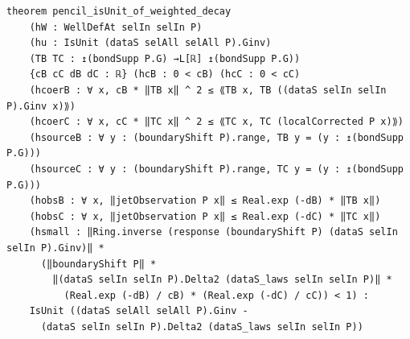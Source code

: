 \begin{theorem}[bp-248]
\begin{verbatim}
theorem pencil_isUnit_of_weighted_decay
    (hW : WellDefAt selIn selIn P)
    (hu : IsUnit (dataS selAll selAll P).Ginv)
    (TB TC : ↥(bondSupp P.G) →L[ℝ] ↥(bondSupp P.G))
    {cB cC dB dC : ℝ} (hcB : 0 < cB) (hcC : 0 < cC)
    (hcoerB : ∀ x, cB * ‖TB x‖ ^ 2 ≤ ⟪TB x, TB ((dataS selIn selIn P).Ginv x)⟫)
    (hcoerC : ∀ x, cC * ‖TC x‖ ^ 2 ≤ ⟪TC x, TC (localCorrected P x)⟫)
    (hsourceB : ∀ y : (boundaryShift P).range, TB y = (y : ↥(bondSupp P.G)))
    (hsourceC : ∀ y : (boundaryShift P).range, TC y = (y : ↥(bondSupp P.G)))
    (hobsB : ∀ x, ‖jetObservation P x‖ ≤ Real.exp (-dB) * ‖TB x‖)
    (hobsC : ∀ x, ‖jetObservation P x‖ ≤ Real.exp (-dC) * ‖TC x‖)
    (hsmall : ‖Ring.inverse (response (boundaryShift P) (dataS selIn selIn P).Ginv)‖ *
      (‖boundaryShift P‖ *
        ‖(dataS selIn selIn P).Delta2 (dataS_laws selIn selIn P)‖ *
          (Real.exp (-dB) / cB) * (Real.exp (-dC) / cC)) < 1) :
    IsUnit ((dataS selAll selAll P).Ginv -
      (dataS selIn selIn P).Delta2 (dataS_laws selIn selIn P))
\end{verbatim}
\end{theorem}

